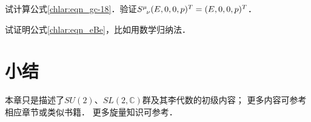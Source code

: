 \begin{exercise}
	试计算公式\eqref{chlar:eqn_gc-18}．验证$S^\mu_{\hphantom{\mu}\nu} (E,0,0,p)^T=(E,0,0,p)^T$．
\end{exercise}

\begin{exercise}
	试证明公式\eqref{chlar:eqn_eBe}，比如用数学归纳法．
\end{exercise}






\section*{小结}


本章只是描述了$SU(2)$、$SL(2,\mathbb{C})$群及其李代数的初级内容；
更多内容可参考\parencite{carmeli-rl1976,taorb-2011-gt}相应章节或类似书籍．  
更多旋量知识可参考\parencite{penrose-Rindler1984}．


\printbibliography[heading=subbibliography,title=第\ref{chlar}章参考文献]

\endinput














